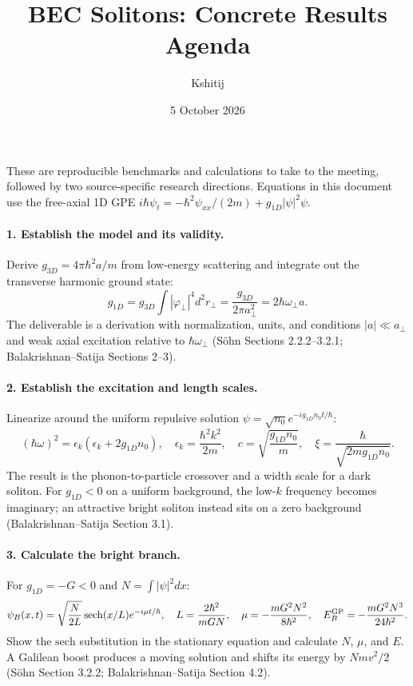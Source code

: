 \documentclass[11pt,a4paper]{article}
\title{BEC Solitons: Concrete Results Agenda}
\author{Kshitij}
\date{5 October 2026}
\begin{document}
\maketitle

These are reproducible benchmarks and calculations to take to the meeting, followed by two source-specific research directions. Equations in this document use the free-axial 1D GPE $i\hbar\psi_t=-\hbar^2\psi_{xx}/(2m)+g_{1D}|\psi|^2\psi$.

\paragraph{1. Establish the model and its validity.}
Derive $g_{3D}=4\pi\hbar^2a/m$ from low-energy scattering and integrate out the transverse harmonic ground state:
\[
g_{1D}=g_{3D}\int|\varphi_\perp|^4d^2r_\perp=\frac{g_{3D}}{2\pi a_\perp^2}=2\hbar\omega_\perp a.
\]
The deliverable is a derivation with normalization, units, and conditions $|a|\ll a_\perp$ and weak axial excitation relative to $\hbar\omega_\perp$ (S\"ohn Sections 2.2.2--3.2.1; Balakrishnan--Satija Sections 2--3).

\paragraph{2. Establish the excitation and length scales.}
Linearize around the uniform repulsive solution $\psi=\sqrt{n_0}e^{-ig_{1D}n_0t/\hbar}$:
\[
(\hbar\omega)^2=\epsilon_k(\epsilon_k+2g_{1D}n_0),\quad
\epsilon_k=\frac{\hbar^2k^2}{2m},\quad
c=\sqrt{\frac{g_{1D}n_0}{m}},\quad
\xi=\frac{\hbar}{\sqrt{2mg_{1D}n_0}}.
\]
The result is the phonon-to-particle crossover and a width scale for a dark soliton. For $g_{1D}<0$ on a uniform background, the low-$k$ frequency becomes imaginary; an attractive bright soliton instead sits on a zero background (Balakrishnan--Satija Section 3.1).

\paragraph{3. Calculate the bright branch.}
For $g_{1D}=-G<0$ and $N=\int|\psi|^2dx$:
\[
\psi_B(x,t)=\sqrt{\frac N{2L}}\,\mathrm{sech}(x/L)e^{-i\mu t/\hbar},\quad
L=\frac{2\hbar^2}{mGN},\quad
\mu=-\frac{mG^2N^2}{8\hbar^2},\quad
E_B^{\rm GP}=-\frac{mG^2N^3}{24\hbar^2}.
\]
Show the $\mathrm{sech}$ substitution in the stationary equation and calculate $N$, $\mu$, and $E$. A Galilean boost produces a moving solution and shifts its energy by $Nm v^2/2$ (S\"ohn Section 3.2.2; Balakrishnan--Satija Section 4.2).
\end{document}
